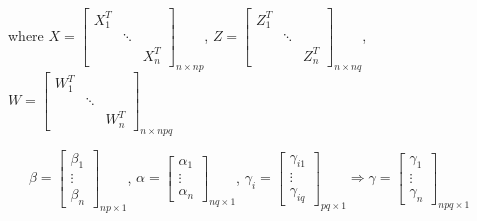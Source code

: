 \documentclass[12pt, a4paper, oneside]{article}
\numberwithin{equation}{section}
\begin{document}
\vspace{0.4cm}where $X = \begin{bmatrix} X_1^T &  &  \\  & \ddots & \\  & & X_n^T \end{bmatrix}_{n\times np}$, $Z = \begin{bmatrix} Z_1^T &  &  \\  & \ddots & \\  & & Z_n^T \end{bmatrix}_{n\times nq}$, $W = \begin{bmatrix} W_1^T &  &  \\  & \ddots & \\  & & W_n^T \end{bmatrix}_{n\times npq}$

\vspace{0.4cm}\ \ \ \qquad$\beta = \begin{bmatrix} \beta_1 \\ \vdots \\ \beta_n \end{bmatrix}_{np\times 1}$, $\alpha = \begin{bmatrix} \alpha_1 \\ \vdots \\ \alpha_n \end{bmatrix}_{nq\times 1}$, $\gamma_i = \begin{bmatrix} \gamma_{i1} \\ \vdots \\ \gamma_{iq} \end{bmatrix}_{pq\times 1}\Rightarrow\gamma = \begin{bmatrix} \gamma_{1} \\ \vdots \\ \gamma_{n} \end{bmatrix}_{npq\times 1}$

\end{document}
